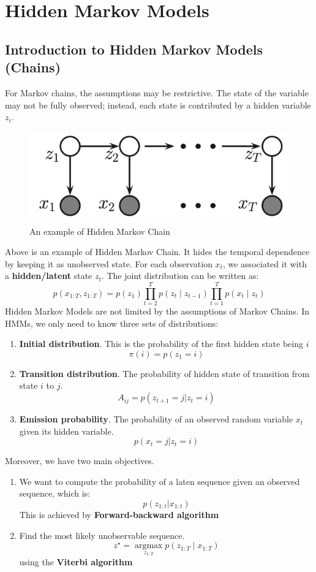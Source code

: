 \section{Hidden Markov Models}
\subsection{Introduction to Hidden Markov Models (Chains)}
For Markov chains, the assumptions may be restrictive. The state of the variable may not be fully observed; instead, each state is contributed by a hidden variable $z_i$.
\begin{figure}[H]
    \centering
    \includegraphics[width = .4\linewidth]{figures/section7/figure_7_1.png}
    \caption{An example of Hidden Markov Chain}
    \label{fig:hidden_markov_chain}
\end{figure}
Above is an example of Hidden Markov Chain. It hides the temporal dependence by keeping it as unobserved state. For each observation $x_t$, we associated it with a \textbf{hidden/latent} state $z_t$. The joint distribution can be written as:
$$p\left(x_{1: T}, z_{1: T}\right)=p\left(z_1\right) \prod_{t=2}^T p\left(z_t \mid z_{t-1}\right) \prod_{t=1}^T p\left(x_t \mid z_t\right)$$
Hidden Markov Models are not limited by the assumptions of Markov Chains. In HMMs, we only need to know three sets of distributions:
\begin{enumerate}
    \item \textbf{Initial distribution}. This is the probability of the first hidden state being $i$
    $$\pi(i)=p(z_1=i)$$
    \item \textbf{Transition distribution}. The probability of hidden state of transition from state $i$ to $j$.
    $$A_{ij}=p(z_{t+1}=j|z_t=i)$$
    \item \textbf{Emission probability}. The probability of an observed random variable $x_t$ given its hidden variable.
    $$p(x_t=j|z_t=i)$$
\end{enumerate}
Moreover, we have two main objectives.
\begin{enumerate}
    \item We want to compute the probability of a laten sequence given an observed sequence, which is:
    $$p(z_{1:t}|x_{1:t})$$
    This is achieved by \textbf{Forward-backward algorithm}
    \item Find the most likely unobservable sequence.
    $$z^{\star}=\underset{z_{1: T}}{\operatorname{argmax}} p\left(z_{1: T} \mid x_{1: T}\right)$$
    using the \textbf{Viterbi algorithm}
\end{enumerate}

